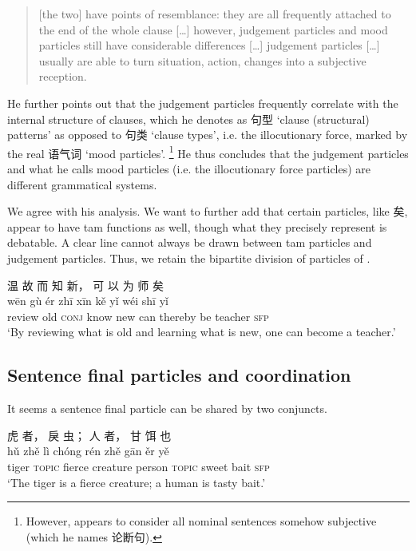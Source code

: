 \documentclass[UTF8, a4paper, oneside, scheme=plain, 12pt]{ctexrep}
\newcommand*{\citepage}[1]{p.~{#1}}
\newcommand{\translate}[1]{`#1'}
\newcommand*{\category}[1]{\textsc{#1}}
\begin{document}
\begin{quote}
    [the two] have points of resemblance: they are all frequently attached to the end of the whole clause [\dots]
    however, judgement particles and mood particles still have considerable differences [\dots] 
    judgement particles [\dots] usually are able to turn situation, action, changes into a subjective reception.
\end{quote}

He further points out that the judgement particles frequently correlate with the internal structure of clauses, which he denotes as 句型 \translate{clause (structural) patterns} as opposed to 句类 \translate{clause types}, i.e. the illocutionary force, marked by the real 语气词 \translate{mood particles}.%
\footnote{
    However, \citet[\citepage{58}]{li2004grammar} appears to consider all nominal sentences somehow subjective (which he names 论断句).
}
He thus concludes that the judgement particles and what he calls mood particles (i.e. the illocutionary force particles) are different grammatical systems.

We agree with his analysis. We want to further add that certain particles, like 矣, appear to have \ac{tam} functions as well,
though what they precisely represent is debatable.
A clear line cannot always be drawn between \ac{tam} particles and judgement particles.
Thus, we retain  the bipartite division of particles of \citet{li2004grammar}.


\begin{exe}    
    \ex\label{ex:grammatical.clause.sfp.aspectual.1}
    \glll 温 故 而 知 新， 可 以 为 师 矣 \\
    wēn gù ér zhī xīn kě yǐ wéi shī yǐ \\
    review old \category{conj} know new can thereby be teacher \category{sfp} \\
    \glt\translate{By reviewing what is old and learning what is new, one can become a teacher.}
\end{exe}

\subsection{Sentence final particles and coordination}

It seems a sentence final particle can be shared by two conjuncts.

\begin{exe}
    \ex\label{ex:grammatical.clause.sfp.judgement.2}
    \glll 虎 者， 戾 虫； 人 者， 甘 饵 也 \\
    hǔ zhě lì chóng rén zhě gān ěr yě \\
    tiger \category{topic} fierce creature person \category{topic} sweet bait \category{sfp} \\
    \glt\translate{The tiger is a fierce creature; a human is tasty bait.}
\end{exe}
\end{document}
